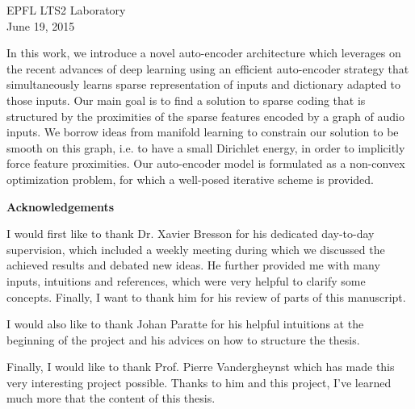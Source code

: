 \documentclass[a4paper,12pt,oneside]{report}
\begin{document}
\begin{titlepage}
\begin{center}
		\vspace{1.5cm}
		\large EPFL LTS2 Laboratory\\
		\vspace{0.8cm}
		\large June 19, 2015
		
	\end{center}
	
\end{titlepage}



\def\abstract{
	\vfil
	\begin{center}
		{\bfseries \abstractname\vspace{-.5em}}
	\end{center}
	\quotation
}
\def\endabstract{\par
	\endquotation
}

\pagestyle{empty}
\begin{abstract}
	In this work, we introduce a novel auto-encoder architecture which leverages on the recent advances of deep learning using an efficient auto-encoder strategy that simultaneously learns sparse representation of inputs and dictionary adapted to those inputs. Our main goal is to find a solution to sparse coding that is structured by the proximities of the sparse features encoded by a graph of audio inputs. We borrow ideas from manifold learning to constrain our solution to be smooth on this graph, i.e. to have a small Dirichlet energy, in order to implicitly force feature proximities. Our auto-encoder model is formulated as a non-convex optimization problem, for which a well-posed iterative scheme is provided.
\end{abstract}

\renewcommand{\abstractname}{Acknowledgements}
\begin{abstract}
	I would first like to thank Dr. Xavier Bresson for his dedicated day-to-day supervision, which included a weekly meeting during which we discussed the achieved results and debated new ideas. He further provided me with many inputs, intuitions and references, which were very helpful to clarify some concepts. Finally, I want to thank him for his review of parts of this manuscript.

	I would also like to thank Johan Paratte for his helpful intuitions at the beginning of the project and his advices on how to structure the thesis.

	Finally, I would like to thank Prof. Pierre Vandergheynst which has made this very interesting project possible. Thanks to him and this project, I've learned much more that the content of this thesis.
\end{abstract}
\end{document}
